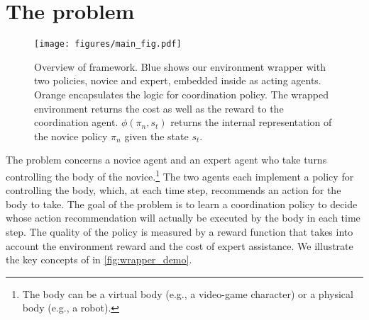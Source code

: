 \section{The \ourMethod problem}\label{sec:methodology}

\begin{figure}[t]
    \centering
    \texttt{[image: figures/main\_fig.pdf]}
    \caption{
    Overview of \ourMethod framework. \colorbox{sbBlue025}{Blue} shows our environment wrapper with two policies, novice and expert, embedded inside as acting agents. 
    \colorbox{sbOrange025}{Orange} encapsulates the logic for coordination policy.
    The wrapped environment returns the cost as well as the reward to the coordination agent. $\phi(\pi_n, s_t)$ returns the internal representation of the novice policy $\pi_n$ given the state $s_t$.
    }
    \label{fig:wrapper_demo}
\end{figure}

The \ourMethod problem concerns a novice agent and an expert agent who take turns controlling the body of the novice.\footnote{The body can be a virtual body (e.g., a video-game character) or a physical body (e.g., a robot).} 
The two agents each implement a policy for controlling the body, which, at each time step, recommends an action for the body to take. 
The goal of the problem is to learn a coordination policy to decide whose action recommendation will actually be executed by the body in each time step.
The quality of the policy is measured by a reward function that takes into account the environment reward and the cost of expert assistance. 
We illustrate the key concepts of \ourMethod in \autoref{fig:wrapper_demo}.

 


